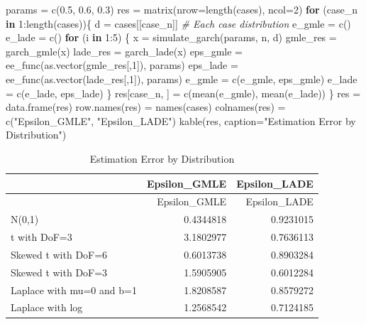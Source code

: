 \documentclass[
  11pt,
]{article}
\newenvironment{Shaded}{\begin{snugshade}}{\end{snugshade}}
\newcommand{\AttributeTok}[1]{\textcolor[rgb]{0.77,0.63,0.00}{#1}}
\newcommand{\CommentTok}[1]{\textcolor[rgb]{0.56,0.35,0.01}{\textit{#1}}}
\newcommand{\ControlFlowTok}[1]{\textcolor[rgb]{0.13,0.29,0.53}{\textbf{#1}}}
\newcommand{\DecValTok}[1]{\textcolor[rgb]{0.00,0.00,0.81}{#1}}
\newcommand{\FloatTok}[1]{\textcolor[rgb]{0.00,0.00,0.81}{#1}}
\newcommand{\FunctionTok}[1]{\textcolor[rgb]{0.00,0.00,0.00}{#1}}
\newcommand{\NormalTok}[1]{#1}
\newcommand{\OtherTok}[1]{\textcolor[rgb]{0.56,0.35,0.01}{#1}}
\newcommand{\SpecialCharTok}[1]{\textcolor[rgb]{0.00,0.00,0.00}{#1}}
\newcommand{\StringTok}[1]{\textcolor[rgb]{0.31,0.60,0.02}{#1}}
\begin{document}
\begin{Shaded}
\begin{Highlighting}[]
\NormalTok{params }\OtherTok{=} \FunctionTok{c}\NormalTok{(}\FloatTok{0.5}\NormalTok{, }\FloatTok{0.6}\NormalTok{, }\FloatTok{0.3}\NormalTok{)}
\NormalTok{res }\OtherTok{=} \FunctionTok{matrix}\NormalTok{(}\AttributeTok{nrow=}\FunctionTok{length}\NormalTok{(cases), }\AttributeTok{ncol=}\DecValTok{2}\NormalTok{)}
\ControlFlowTok{for}\NormalTok{ (case\_n }\ControlFlowTok{in} \DecValTok{1}\SpecialCharTok{:}\FunctionTok{length}\NormalTok{(cases))\{}
\NormalTok{  d }\OtherTok{=}\NormalTok{ cases[[case\_n]] }\CommentTok{\# Each case distribution}
\NormalTok{  e\_gmle }\OtherTok{=} \FunctionTok{c}\NormalTok{()}
\NormalTok{  e\_lade }\OtherTok{=} \FunctionTok{c}\NormalTok{()}
  \ControlFlowTok{for}\NormalTok{ (i }\ControlFlowTok{in} \DecValTok{1}\SpecialCharTok{:}\DecValTok{5}\NormalTok{) \{}
\NormalTok{    x }\OtherTok{=} \FunctionTok{simulate\_garch}\NormalTok{(params, n, d)}
\NormalTok{    gmle\_res }\OtherTok{=} \FunctionTok{garch\_gmle}\NormalTok{(x)}
\NormalTok{    lade\_res }\OtherTok{=} \FunctionTok{garch\_lade}\NormalTok{(x)}
\NormalTok{    eps\_gmle }\OtherTok{=} \FunctionTok{ee\_func}\NormalTok{(}\FunctionTok{as.vector}\NormalTok{(gmle\_res[,}\DecValTok{1}\NormalTok{]), params)}
\NormalTok{    eps\_lade }\OtherTok{=} \FunctionTok{ee\_func}\NormalTok{(}\FunctionTok{as.vector}\NormalTok{(lade\_res[,}\DecValTok{1}\NormalTok{]), params)}
\NormalTok{    e\_gmle }\OtherTok{=} \FunctionTok{c}\NormalTok{(e\_gmle, eps\_gmle)}
\NormalTok{    e\_lade }\OtherTok{=} \FunctionTok{c}\NormalTok{(e\_lade, eps\_lade)}
\NormalTok{  \}}
\NormalTok{  res[case\_n, ] }\OtherTok{=} \FunctionTok{c}\NormalTok{(}\FunctionTok{mean}\NormalTok{(e\_gmle), }\FunctionTok{mean}\NormalTok{(e\_lade))}
\NormalTok{\}}
\NormalTok{res }\OtherTok{=} \FunctionTok{data.frame}\NormalTok{(res)}
\FunctionTok{row.names}\NormalTok{(res) }\OtherTok{=} \FunctionTok{names}\NormalTok{(cases)}
\FunctionTok{colnames}\NormalTok{(res) }\OtherTok{=} \FunctionTok{c}\NormalTok{(}\StringTok{"Epsilon\_GMLE"}\NormalTok{, }\StringTok{"Epsilon\_LADE"}\NormalTok{)}
\FunctionTok{kable}\NormalTok{(res, }\AttributeTok{caption=}\StringTok{"Estimation Error by Distribution"}\NormalTok{)}
\end{Highlighting}
\end{Shaded}

\begin{longtable}[]{@{}lrr@{}}
\caption{Estimation Error by Distribution}\tabularnewline
\toprule
& Epsilon\_GMLE & Epsilon\_LADE \\
\midrule
\endfirsthead
\toprule
& Epsilon\_GMLE & Epsilon\_LADE \\
\midrule
\endhead
N(0,1) & 0.4344818 & 0.9231015 \\
t with DoF=3 & 3.1802977 & 0.7636113 \\
Skewed t with DoF=6 & 0.6013738 & 0.8903284 \\
Skewed t with DoF=3 & 1.5905905 & 0.6012284 \\
Laplace with mu=0 and b=1 & 1.8208587 & 0.8579272 \\
Laplace with log & 1.2568542 & 0.7124185 \\
\bottomrule
\end{longtable}
\end{document}
